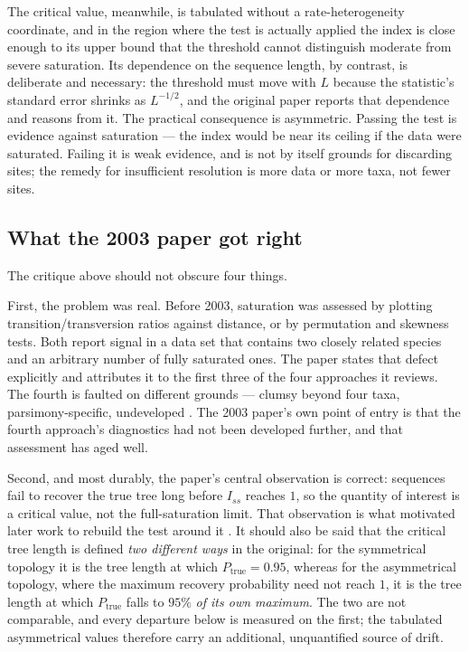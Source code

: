 \documentclass[preprint,12pt,authoryear]{elsarticle}
\newcommand{\Iss}{I_{ss}}
\theoremstyle{definition}
\theoremstyle{remark}
\begin{document}
The critical value, meanwhile, is tabulated without a rate-heterogeneity
coordinate, and in the region where the test is actually applied the index is
close enough to its upper bound that the threshold cannot distinguish moderate
from severe saturation. Its dependence on the sequence length, by contrast, is
deliberate and necessary: the threshold must move with $L$ because the
statistic's standard error shrinks as $L^{-1/2}$, and the original paper
reports that dependence and reasons from it. The practical consequence is
asymmetric. Passing the test is evidence against saturation --- the index
would be near its ceiling if the data were saturated. Failing it is weak
evidence, and is not by itself grounds for discarding sites; the remedy for
insufficient resolution is more data or more taxa, not fewer sites.

\subsection{What the 2003 paper got right}
\label{sec:right}

The critique above should not obscure four things.

First, the problem was real. Before 2003, saturation was assessed by plotting
transition\slash transversion ratios against distance, or by permutation and
skewness tests. Both report signal in a data set that contains two closely
related species and an arbitrary number of fully saturated ones. The paper
states that defect explicitly and attributes it to the first three of the four
approaches it reviews. The fourth is faulted on different grounds --- clumsy
beyond four taxa, parsimony-specific, undeveloped
\citep{steel1993confidence,steel1995frequency}. The 2003 paper's own point of
entry is that the fourth approach's diagnostics had not been developed
further, and that assessment has aged well.

Second, and most durably, the paper's central observation is correct: sequences
fail to recover the true tree long before $\Iss$ reaches $1$, so the quantity of
interest is a critical value, not the full-saturation limit. That observation is
what motivated later work to rebuild the test around it
\citep{duchene2022saturation}. It should also be said that the critical tree
length is defined \emph{two different ways} in the original: for the symmetrical
topology it is the tree length at which $P_{\mathrm{true}}=0.95$, whereas for the
asymmetrical topology, where the maximum recovery probability need not reach
$1$, it is the tree length at which $P_{\mathrm{true}}$ falls to $95\%$ \emph{of
its own maximum}. The two are not comparable, and every departure below is
measured on the first; the tabulated asymmetrical values therefore carry an
additional, unquantified source of drift.
\end{document}
